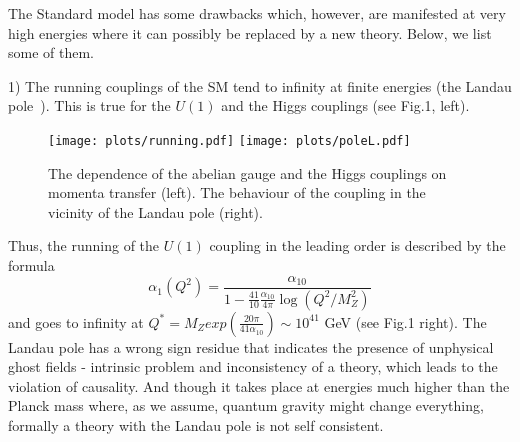 \documentclass{cernyrep}
\begin{document}
The Standard model has some drawbacks which, however, are manifested at very high energies where it can possibly be replaced by a new theory. Below, we list some of them.

1) The running couplings of the SM tend to infinity at finite energies (the Landau pole~\cite{Landau}). This is true for the $U(1)$ and the Higgs couplings (see Fig.1, left). 
\begin{figure}[h!]
\begin{center}
\leavevmode
\texttt{[image: plots/running.pdf]}\hspace{1cm}
\texttt{[image: plots/poleL.pdf]}
\end{center}
\caption{The dependence of the abelian gauge and the Higgs couplings on momenta transfer (left). The behaviour of the coupling in the vicinity of the Landau pole (right).}
\label{Sigma_a}
\end{figure}
Thus, the running of the $U(1)$ coupling in the leading order is described by the formula
\begin{equation}
\alpha_1(Q^2)=\frac{\alpha_{10}}{1-\frac{41}{10}\frac{\alpha_{10}}{4\pi}\log(Q^2/M_Z^2)}
\end{equation}
and goes to infinity at $Q^*=M_Zexp(\frac{20\pi}{41\alpha_{10}})\sim 10^{41}$ GeV  (see Fig.1 right).
 The Landau pole has a wrong sign residue that indicates the presence of unphysical ghost fields - intrinsic problem and inconsistency of a theory, which leads to the violation of causality.
And though it takes place at energies much higher than the Planck mass where, as we assume,  quantum gravity might change everything, formally a theory with the Landau pole is not self consistent.
 
\end{document}

